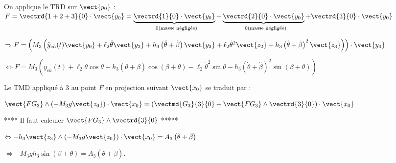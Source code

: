 \begin{corrige}
On applique le TRD sur $\vect{y_0}$ :
$F = \vectrd{1+2+3}{0}\cdot \vect{y_0}= \underbrace{\vectrd{1}{0} \cdot  \vect{y_0}}_{=0 \text{(masse négligée)}}+ \underbrace{\vectrd{2}{0}\cdot  \vect{y_0}}_{=0 \text{(masse négligée)}} + \vectrd{3}{0}\cdot \vect{y_0}$

 $ \Rightarrow F = \left( M_3\left(\ddot{y}_{ch}(t) \vect{y_0}+\ell_2\ddot{\theta} \vect{y_2}+h_3\left(\ddot{\theta}+\ddot{\beta}\right) \vect{y_3}
+   
\ell_2\dot{\theta}^2 \vect{z_2}  +h_3\left(\dot{\theta}+\dot{\beta}\right)^2\vect{z_3}\right)\right) \cdot \vect{y_0}$

 $ \Leftrightarrow F =  M_3\left(\ddot{y}_{ch}(t) +\ell_2\ddot{\theta} \cos \theta +h_3\left(\ddot{\theta}+\ddot{\beta}\right) \cos \left( \beta+\theta\right)
-
\ell_2\dot{\theta}^2 \sin \theta   -h_3\left(\dot{\theta}+\dot{\beta}\right)^2  \sin \left( \beta+\theta\right)\right) $
\end{corrige}
\else
\fi

\ifprof
\begin{corrige}
%
%



Le TMD appliqué à 3 au point $F$ en projection suivant $\vect{x_0}$ se traduit par : 

$\vect{FG_3}\wedge \left(-M_3g \vect{z_0} \right) \cdot \vect{x_0} =\left(\vectmd{G_3}{3}{0}+\vect{FG_3}\wedge \vectrd{3}{0}\right)\cdot \vect{x_0}$

**** Il faut calculer $\vect{FG_3}\wedge \vectrd{3}{0}$ *****

$\Leftrightarrow -h_3 \vect{z_3} \wedge \left(-M_3g \vect{z_0} \right) \cdot \vect{x_0} =A_3 \left(\ddot{\theta}+\ddot{\beta} \right)$

$\Leftrightarrow - M_3gh_3 \sin\left( \beta + \theta\right) =A_3 \left(\ddot{\theta}+\ddot{\beta} \right)$.
\end{corrige}
\else
\fi


